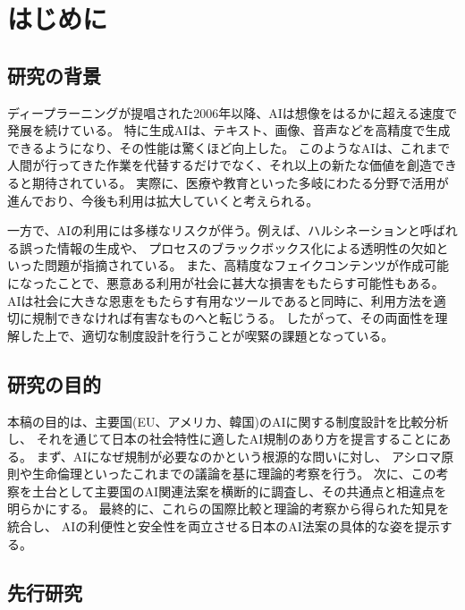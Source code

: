 \chapter{はじめに}

\section{研究の背景}
ディープラーニングが提唱された2006年以降、AIは想像をはるかに超える速度で発展を続けている。
特に生成AIは、テキスト、画像、音声などを高精度で生成できるようになり、その性能は驚くほど向上した。
このようなAIは、これまで人間が行ってきた作業を代替するだけでなく、それ以上の新たな価値を創造できると期待されている。
実際に、医療や教育といった多岐にわたる分野で活用が進んでおり、今後も利用は拡大していくと考えられる。

一方で、AIの利用には多様なリスクが伴う。例えば、ハルシネーションと呼ばれる誤った情報の生成や、
プロセスのブラックボックス化による透明性の欠如といった問題が指摘されている。
また、高精度なフェイクコンテンツが作成可能になったことで、悪意ある利用が社会に甚大な損害をもたらす可能性もある。
AIは社会に大きな恩恵をもたらす有用なツールであると同時に、利用方法を適切に規制できなければ有害なものへと転じうる。
したがって、その両面性を理解した上で、適切な制度設計を行うことが喫緊の課題となっている。


\section{研究の目的}
本稿の目的は、主要国(EU、アメリカ、韓国)のAIに関する制度設計を比較分析し、
それを通じて日本の社会特性に適したAI規制のあり方を提言することにある。
まず、AIになぜ規制が必要なのかという根源的な問いに対し、
アシロマ原則や生命倫理といったこれまでの議論を基に理論的考察を行う。
次に、この考察を土台として主要国のAI関連法案を横断的に調査し、その共通点と相違点を明らかにする。
最終的に、これらの国際比較と理論的考察から得られた知見を統合し、
AIの利便性と安全性を両立させる日本のAI法案の具体的な姿を提示する。

\section{先行研究}


